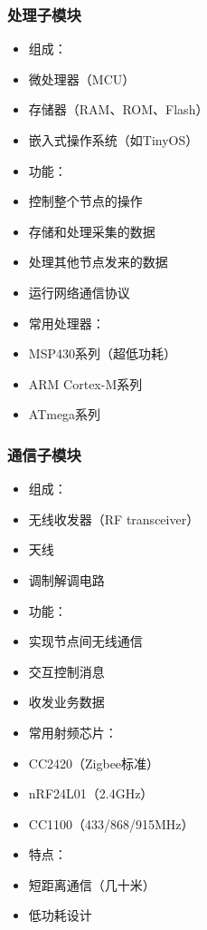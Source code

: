 \documentclass[aspectratio=43]{beamer}
\begin{document}
\begin{frame}
  \frametitle{处理子模块}

  \begin{itemize}
  \item<+-> 组成：
  \item<+-> 微处理器（MCU）
  \item<+-> 存储器（RAM、ROM、Flash）
  \item<+-> 嵌入式操作系统（如TinyOS）
  \item<+-> 功能：
  \item<+-> 控制整个节点的操作
  \item<+-> 存储和处理采集的数据
  \item<+-> 处理其他节点发来的数据
  \item<+-> 运行网络通信协议
  \item<+-> 常用处理器：
  \item<+-> MSP430系列（超低功耗）
  \item<+-> ARM Cortex-M系列
  \item<+-> ATmega系列
  \end{itemize}
\end{frame}

\begin{frame}
  \frametitle{通信子模块}

  \begin{itemize}
  \item<+-> 组成：
  \item<+-> 无线收发器（RF transceiver）
  \item<+-> 天线
  \item<+-> 调制解调电路
  \item<+-> 功能：
  \item<+-> 实现节点间无线通信
  \item<+-> 交互控制消息
  \item<+-> 收发业务数据
  \item<+-> 常用射频芯片：
  \item<+-> CC2420（Zigbee标准）
  \item<+-> nRF24L01（2.4GHz）
  \item<+-> CC1100（433/868/915MHz）
  \item<+-> 特点：
  \item<+-> 短距离通信（几十米）
  \item<+-> 低功耗设计
  \end{itemize}
\end{frame}
\end{document}
